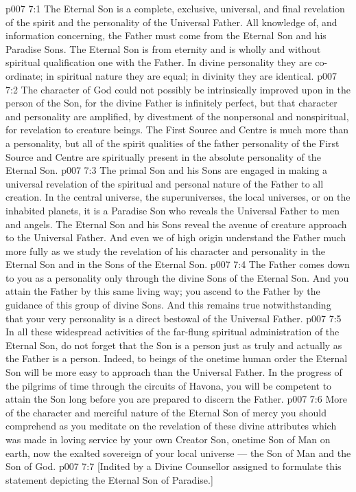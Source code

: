 \vs p007 7:1 The Eternal Son is a complete, exclusive, universal, and final revelation of the spirit and the personality of the Universal Father. All knowledge of, and information concerning, the Father must come from the Eternal Son and his Paradise Sons. The Eternal Son is from eternity and is wholly and without spiritual qualification one with the Father. In divine personality they are co\hyp{}ordinate; in spiritual nature they are equal; in divinity they are identical.
\vs p007 7:2 The character of God could not possibly be intrinsically improved upon in the person of the Son, for the divine Father is infinitely perfect, but that character and personality are amplified, by divestment of the nonpersonal and nonspiritual, for revelation to creature beings. The First Source and Centre is much more than a personality, but all of the spirit qualities of the father personality of the First Source and Centre are spiritually present in the absolute personality of the Eternal Son.
\vs p007 7:3 The primal Son and his Sons are engaged in making a universal revelation of the spiritual and personal nature of the Father to all creation. In the central universe, the superuniverses, the local universes, or on the inhabited planets, it is a Paradise Son who reveals the Universal Father to men and angels. The Eternal Son and his Sons reveal the avenue of creature approach to the Universal Father. And even we of high origin understand the Father much more fully as we study the revelation of his character and personality in the Eternal Son and in the Sons of the Eternal Son.
\vs p007 7:4 The Father comes down to you as a personality only through the divine Sons of the Eternal Son. And you attain the Father by this same living way; you ascend to the Father by the guidance of this group of divine Sons. And this remains true notwithstanding that your very personality is a direct bestowal of the Universal Father.
\vs p007 7:5 \pc In all these widespread activities of the far\hyp{}flung spiritual administration of the Eternal Son, do not forget that the Son is a person just as truly and actually as the Father is a person. Indeed, to beings of the onetime human order the Eternal Son will be more easy to approach than the Universal Father. In the progress of the pilgrims of time through the circuits of Havona, you will be competent to attain the Son long before you are prepared to discern the Father.
\vs p007 7:6 More of the character and merciful nature of the Eternal Son of mercy you should comprehend as you meditate on the revelation of these divine attributes which was made in loving service by your own Creator Son, onetime Son of Man on earth, now the exalted sovereign of your local universe --- the Son of Man and the Son of God.
\vsetoff
\vs p007 7:7 [Indited by a Divine Counsellor assigned to formulate this statement depicting the Eternal Son of Paradise.]
